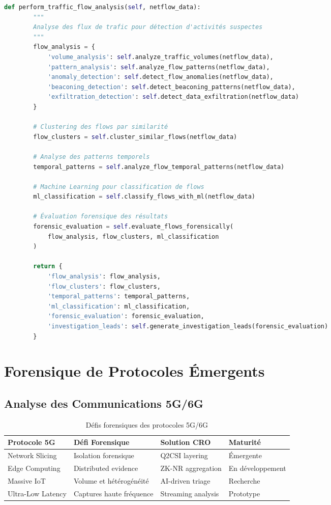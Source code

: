 \begin{lstlisting}[language=Python, caption=Analyseur géospatial pour attribution]
    def perform_traffic_flow_analysis(self, netflow_data):
        """
        Analyse des flux de trafic pour détection d'activités suspectes
        """
        flow_analysis = {
            'volume_analysis': self.analyze_traffic_volumes(netflow_data),
            'pattern_analysis': self.analyze_flow_patterns(netflow_data),
            'anomaly_detection': self.detect_flow_anomalies(netflow_data),
            'beaconing_detection': self.detect_beaconing_patterns(netflow_data),
            'exfiltration_detection': self.detect_data_exfiltration(netflow_data)
        }
        
        # Clustering des flows par similarité
        flow_clusters = self.cluster_similar_flows(netflow_data)
        
        # Analyse des patterns temporels
        temporal_patterns = self.analyze_flow_temporal_patterns(netflow_data)
        
        # Machine Learning pour classification de flows
        ml_classification = self.classify_flows_with_ml(netflow_data)
        
        # Évaluation forensique des résultats
        forensic_evaluation = self.evaluate_flows_forensically(
            flow_analysis, flow_clusters, ml_classification
        )
        
        return {
            'flow_analysis': flow_analysis,
            'flow_clusters': flow_clusters,
            'temporal_patterns': temporal_patterns,
            'ml_classification': ml_classification,
            'forensic_evaluation': forensic_evaluation,
            'investigation_leads': self.generate_investigation_leads(forensic_evaluation)
        }
\end{lstlisting}

\section{Forensique de Protocoles Émergents}

\subsection{Analyse des Communications 5G/6G}

\begin{table}[h]
\centering
\begin{tabular}{|l|l|l|l|}
\hline
\textbf{Protocole 5G} & \textbf{Défi Forensique} & \textbf{Solution CRO} & \textbf{Maturité} \\
\hline
Network Slicing & Isolation forensique & Q2CSI layering & Émergente \\
Edge Computing & Distributed evidence & ZK-NR aggregation & En développement \\
Massive IoT & Volume et hétérogénéité & AI-driven triage & Recherche \\
Ultra-Low Latency & Captures haute fréquence & Streaming analysis & Prototype \\
\hline
\end{tabular}
\caption{Défis forensiques des protocoles 5G/6G}
\end{table}

